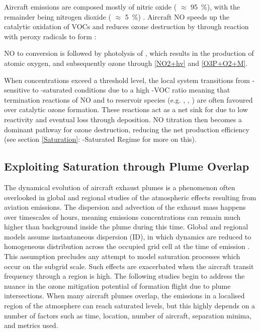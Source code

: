 
Aircraft  emissions are composed mostly of nitric oxide ( $\approx$ 95~\%), with the remainder being nitrogen dioxide ( $\approx$ 5~\%) \cite{Klemm1998}. Aircraft NO speeds up the catalytic oxidation of VOCs and reduces ozone destruction by  through reaction with peroxy radicals to form :


NO to  conversion is followed by photolysis of , which results in the production of atomic oxygen, and subsequently ozone \cite{Fittschen2019} through \eqref{NO2+hv} and \eqref{O3P+O2+M}.


When  concentrations exceed a threshold level, the local system transitions from -sensitive to -saturated conditions due to a high -VOC ratio meaning that termination reactions of NO and  to reservoir species (e.g. , , ) are often favoured over catalytic ozone formation. These reactions act as a net sink for  due to low reactivity and eventual loss through deposition. NO titration then becomes a dominant pathway for ozone destruction, reducing the net  production efficiency (see section \ref{Saturation}: -Saturated Regime for more on this). 


\subsection{Exploiting  Saturation through Plume Overlap}
The dynamical evolution of aircraft exhaust plumes is a phenomenon often overlooked in global and regional studies of the atmospheric effects resulting from aviation emissions. The dispersion and advection of the exhaust mass happens over timescales of hours, meaning emissions concentrations can remain much higher than background inside the plume during this time. Global and regional models assume instantaneous dispersion (ID), in which dynamics are reduced to homogeneous distribution across the occupied grid cell at the time of emission \cite{Paoli2011}. This assumption precludes any attempt to model saturation processes which occur on the subgrid scale. Such effects are exacerbated when the aircraft transit frequency through a region is high. The following studies begin to address the nuance in the ozone mitigation potential of formation flight due to plume intersections. When many aircraft plumes overlap, the  emissions in a localised region of the atmosphere can reach saturated levels, but this highly depends on a number of factors such as time, location, number of aircraft, separation minima, and metrics used.

